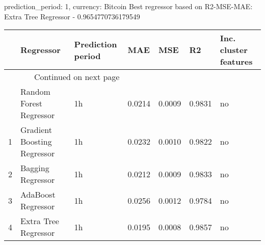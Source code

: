 
prediction_period: 1, currency: Bitcoin
Best regressor based on R2-MSE-MAE: Extra Tree Regressor - 0.9654770736179549
\begin{longtable}{lllllll}
\toprule
{} &                    Regressor & Prediction period &     MAE &     MSE &      R2 & Inc. cluster features \\
\midrule
\endhead
\midrule
\multicolumn{3}{r}{{Continued on next page}} \\
\midrule
\endfoot

\bottomrule
\endlastfoot
0 &      Random Forest Regressor &                1h &  0.0214 &  0.0009 &  0.9831 &                    no \\
1 &  Gradient Boosting Regressor &                1h &  0.0232 &  0.0010 &  0.9822 &                    no \\
2 &            Bagging Regressor &                1h &  0.0212 &  0.0009 &  0.9833 &                    no \\
3 &           AdaBoost Regressor &                1h &  0.0256 &  0.0012 &  0.9784 &                    no \\
4 &         Extra Tree Regressor &                1h &  0.0195 &  0.0008 &  0.9857 &                    no \\
\end{longtable}
